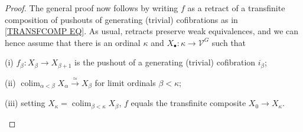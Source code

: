 \documentclass[a4paper,10pt
,draft
]{article}%
\numberwithin{equation}{section}
\numberwithin{figure}{section}
\theoremstyle{definition} %
\DeclareMathOperator{\colim}{colim}%
\newcommand{\1}{\ensuremath{\mathbbm 1}}%
\begin{document}
\begin{proof}
The general proof now follows by writing $f$ as a retract of a transfinite composition of pushouts of generating (trivial) cofibrations as in \eqref{TRANSFCOMP EQ}.
As usual, retracts preserve weak equivalences,
and we can hence assume that there is an ordinal $\kappa$
and $X_{\bullet} \colon \kappa \to \mathcal{V}^G$
such that 
\begin{inparaenum}
\item[(i)] 
$f_{\beta} \colon X_{\beta} \to X_{\beta+1}$
is the pushout of a generating (trivial) cofibration $i_{\beta}$;
\item[(ii)] 
$\colim_{\alpha < \beta} X_{\alpha} \xrightarrow{\simeq} X_{\beta}$ for limit ordinals $\beta < \kappa$;
\item[(iii)] setting 
$X_{\kappa} = \colim_{\beta < \kappa} X_{\beta}$, 
$f$ equals the transfinite composite $X_0 \to X_{\kappa}$.
\end{inparaenum}


\end{proof}
\end{document}
